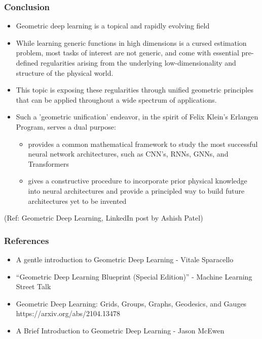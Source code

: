 \begin{frame}[fragile]\frametitle{Conclusion}

\begin{itemize}
\item Geometric deep learning is a topical and rapidly evolving field
\item  While learning generic functions in high dimensions is a cursed estimation problem, most tasks of interest are not generic, and come with essential pre-defined regularities arising from the underlying low-dimensionality and structure of the physical world. 
\item This topic is  exposing these regularities through unified geometric principles that can be applied throughout a wide spectrum of applications.
\item Such a 'geometric unification' endeavor, in the spirit of Felix Klein's Erlangen Program, serves a dual purpose: 
\begin{itemize}
\item  provides a common mathematical framework to study the most successful neural network architectures, such as CNN's, RNNs, GNNs, and Transformers
\item gives a constructive procedure to incorporate prior physical knowledge into neural architectures and provide a principled way to build future architectures yet to be invented
	\end{itemize}
	\end{itemize}

{\tiny (Ref: Geometric Deep Learning, LinkedIn post by Ashish Patel)}

\end{frame}



\begin{frame}[fragile]\frametitle{References}

\begin{itemize}
\item A gentle introduction to Geometric Deep Learning - Vitale Sparacello
\item ``Geometric Deep Learning Blueprint (Special Edition)'' - Machine Learning Street Talk
\item Geometric Deep Learning: Grids, Groups, Graphs, Geodesics, and Gauges
https://arxiv.org/abs/2104.13478
\item A Brief Introduction to Geometric Deep Learning - Jason McEwen
\end{itemize}
	  
\end{frame}
